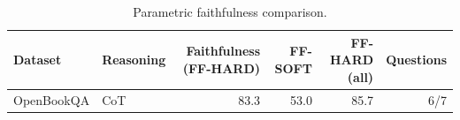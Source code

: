 \begin{table}[t]
\centering
\caption{Parametric faithfulness comparison.}
\label{tab:cot-tot-faithfulness}
\begin{tabular}{llrrrr}
\toprule
Dataset & Reasoning & Faithfulness (FF-HARD) & FF-SOFT & FF-HARD (all) & Questions \\
\midrule
OpenBookQA & CoT & 83.3 & 53.0 & 85.7 & 6/7 \\
\bottomrule
\end{tabular}
\end{table}
